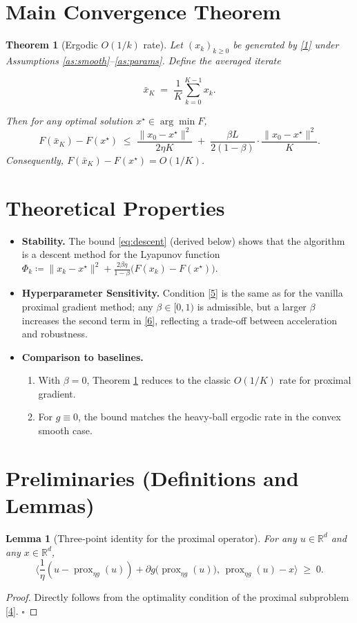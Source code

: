 \documentclass{article}
\newtheorem{theorem}{Theorem}
\newtheorem{lemma}{Lemma}
\newcommand{\prox}{\operatorname{prox}}
\begin{document}
\section*{Main Convergence Theorem}
\begin{theorem}[Ergodic $O(1/k)$ rate]\label{thm:rate}
Let $(x_k)_{k\ge0}$ be generated by \eqref{1} under Assumptions \ref{as:smooth}–\ref{as:params}.  
Define the averaged iterate  

\[
\bar{x}_K \;=\; \frac{1}{K}\sum_{k=0}^{K-1}x_{k}.
\]

Then for any optimal solution $x^\star\in\arg\min F$,
\[
F(\bar{x}_K)-F(x^\star)\;\le\;
\frac{\|x_0-x^\star\|^2}{2\eta K}\;+\;\frac{\beta L}{2(1-\beta)}\cdot\frac{\|x_0-x^\star\|^2}{K}.
\tag{6}
\]
Consequently, $F(\bar{x}_K)-F(x^\star)=O(1/K)$.
\end{theorem}

\section*{Theoretical Properties}
\begin{itemize}
  \item \textbf{Stability.} The bound \eqref{eq:descent} (derived below) shows that the algorithm is a descent method for the Lyapunov function  
  $\Phi_k\coloneqq \|x_k-x^\star\|^2 + \frac{2\beta\eta}{1-\beta}\bigl(F(x_k)-F(x^\star)\bigr)$.
  \item \textbf{Hyperparameter Sensitivity.} Condition \eqref{5} is the same as for the vanilla proximal gradient method; any $\beta\in[0,1)$ is admissible, but a larger $\beta$ increases the second term in \eqref{6}, reflecting a trade‑off between acceleration and robustness.
  \item \textbf{Comparison to baselines.} 
  \begin{enumerate}
      \item With $\beta=0$, Theorem \ref{thm:rate} reduces to the classic $O(1/K)$ rate for proximal gradient.
      \item For $g\equiv0$, the bound matches the heavy‑ball ergodic rate in the convex smooth case.
  \end{enumerate}
\end{itemize}

\section*{Preliminaries (Definitions and Lemmas)}
\begin{lemma}[Three‑point identity for the proximal operator]\label{lem:prox}
For any $u\in\mathbb{R}^d$ and any $x\in\mathbb{R}^d$,
\[
\bigl\langle \frac{1}{\eta}(u-\prox_{\eta g}(u))+\partial g\bigl(\prox_{\eta g}(u)\bigr),\,
\prox_{\eta g}(u)-x\bigr\rangle \;\ge\;0 .
\tag{7}
\]
\end{lemma}
\begin{proof}
Directly follows from the optimality condition of the proximal subproblem \eqref{4}. \hfill $\square$
\end{proof}
\end{document}
